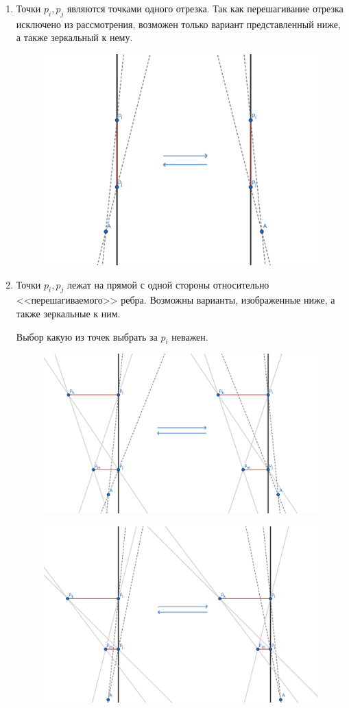 \documentclass[letterpaper,12pt]{article}
\begin{document}
\begin{enumerate}
      \item Точки $p_i, p_j$ являются точками одного отрезка. 
            Так как перешагивание отрезка исключено из рассмотрения,
            возможен только вариант представленный ниже, а также
            зеркальный к нему.

            \begin{figure}[h]
                  \centering
                  \includegraphics[width=.5\linewidth]{one_segment_1.png}
            \end{figure}

      \item Точки $p_i, p_j$ лежат на прямой с одной стороны относительно
            <<перешагиваемого>> ребра. Возможны варианты, изображенные ниже,
            а также зеркальные к ним.

            Выбор какую из точек выбрать за $p_i$ неважен.

            \begin{figure}[H]
                  \centering
                  \includegraphics[width=.6\linewidth]{one_side_1.png}
            \end{figure}

            \begin{figure}[H]
                  \centering
                  \includegraphics[width=.6\linewidth]{one_side_3.png}
            \end{figure}


\end{enumerate}
\end{document}
